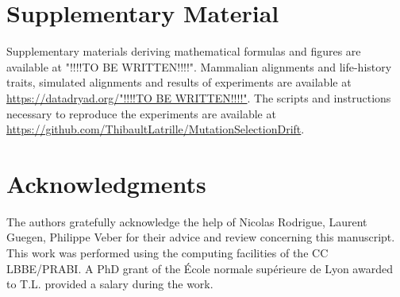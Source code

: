\documentclass[a4paper]{MBE}
\begin{document}


\section{Supplementary Material}
Supplementary materials deriving mathematical formulas and figures are available at "!!!!TO BE WRITTEN!!!!".
Mammalian alignments and life-history traits, simulated alignments and results of experiments are available at \url{https://datadryad.org/"!!!!TO BE WRITTEN!!!!"}.
The scripts and instructions necessary to reproduce the experiments are available at \url{https://github.com/ThibaultLatrille/MutationSelectionDrift}.

\section{Acknowledgments}
The authors gratefully acknowledge the help of Nicolas Rodrigue, Laurent Guegen, Philippe Veber for their advice and review concerning this manuscript.
This work was performed using the computing facilities of the CC LBBE/PRABI.
A PhD grant of the École normale supérieure de Lyon awarded to T.L.
provided a salary during the work.


\end{document}
